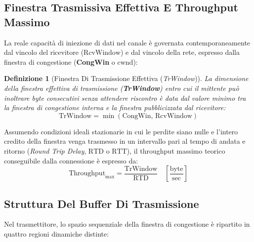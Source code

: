 \documentclass[11pt, a4paper]{article}
\newtheorem{theorem}{Definizione}
\begin{document}
\subsection{Finestra Trasmissiva Effettiva E Throughput Massimo}

La reale capacità di iniezione di dati nel canale è governata contemporaneamente dal vincolo del ricevitore ($\text{RcvWindow}$) e dal vincolo della rete, espresso dalla finestra di congestione (\textbf{CongWin} o $\text{cwnd}$):


\begin{theorem}[Finestra Di Trasmissione Effettiva (\emph{TrWindow})]
La dimensione della finestra effettiva di trasmissione (\textbf{TrWindow}) entro cui il mittente può inoltrare byte consecutivi senza attendere riscontro è data dal valore minimo tra la finestra di congestione interna e la finestra pubblicizzata dal ricevitore:
\[
    \boxed{\text{TrWindow} = \min\left(\text{CongWin}, \, \text{RcvWindow}\right)}
\]
\end{theorem}

Assumendo condizioni ideali stazionarie in cui le perdite siano nulle e l'intero credito della finestra venga trasmesso in un intervallo pari al tempo di andata e ritorno (\emph{Round Trip Delay}, $\text{RTD}$ o $\text{RTT}$), il throughput massimo teorico conseguibile dalla connessione è espresso da:
\[
    \boxed{\text{Throughput}_{\max} = \frac{\text{TrWindow}}{\text{RTD}} \quad \left[\frac{\text{byte}}{\text{sec}}\right]}
\]

\subsection{Struttura Del Buffer Di Trasmissione}

Nel trasmettitore, lo spazio sequenziale della finestra di congestione è ripartito in quattro regioni dinamiche distinte:

\end{document}
